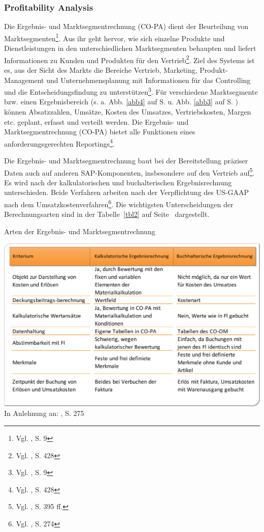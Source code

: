 \subsubsection{Profitability Analysis} %
Die Ergebnis- und Marktsegmentrechnung (CO-PA) dient der Beurteilung von Marktsegmenten\footnote{Vgl. \cite{SAPCOPA2001}, S. 9}.
Aus ihr geht hervor, wie sich einzelne Produkte und Dienstleistungen in den unterschiedlichen Marktsegmenten behaupten und liefert Informationen zu Kunden und Produkten für den Vertrieb\footnote{Vgl. \cite{Patel2009}, S. 428}.
Ziel des Systems ist es, aus der Sicht des Markts die Bereiche Vertrieb, Marketing, Produkt-Management und Unternehmensplanung mit Informationen für das Controlling und die Entscheidungsfindung zu unterstützen\footnote{Vgl. \cite{SAPCOPA2001}, S. 9}.
Für verschiedene Marktsegmente bzw. einen Ergebnisbereich (s. a. Abb. \ref{abb4} auf S. \pageref{abb4} u. Abb. \ref{abb3} auf S. \pageref{abb3}) können Absatzzahlen, Umsätze, Kosten des Umsatzes, Vertriebskosten, Margen etc. geplant, erfasst und verteilt werden. Die Ergebnis- und Marktsegmentrechnung (CO-PA) bietet alle Funktionen eines anforderungsgerechten Reportings\footnote{Vgl. \cite{Patel2009}, S. 428}.

Die Ergebnis- und Marktsegmentrechnung baut bei der Bereitstellung präziser Daten auch auf anderen SAP-Komponenten, insbesondere auf den Vertrieb auf\footnote{Vgl. \cite{Patel2009}, S. 395 ff.}. Es wird nach der kalkulatorischen und buchalterischen Ergebnisrechnung unterschieden. Beide Verfahren arbeiten nach der Verpflichtung des US-GAAP nach dem Umsatzkostenverfahren\footnote{Vgl. \cite{Klein2010}, S. 274}. Die wichtigsten Unterscheidungen der Berechnungsarten sind in der Tabelle~\ref{tbl2} auf Seite~\pageref{tbl2} dargestellt. 
\begin{table}[htbp]
\begin{center}
\caption[Arten der Ergebnis- und Marktsegmentrechnung]{Arten der Ergebnis- und Marktsegmentrechnung}\label{tbl2}
\includegraphics[width=1\textwidth]{Images/ergebnisrechnung.png}
{\footnotesize In Anlehnung an: \cite{Klein2010}, S. 275}
\end{center}
\end{table}\noindent